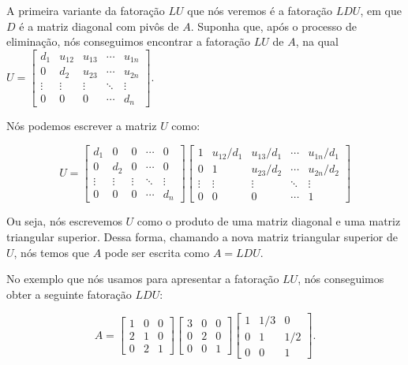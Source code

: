A primeira variante da fatoração $LU$ que nós veremos é a fatoração $LDU$, em que $D$ é a matriz diagonal com pivôs de $A$. Suponha que, após o processo de eliminação, nós conseguimos encontrar a fatoração $LU$ de $A$, na qual $U = \begin{bmatrix}
	d_1 & u_{12} & u_{13} & \cdots & u_{1n} \\
	0 & d_2 & u_{23} & \cdots & u_{2n} \\
	\vdots & \vdots & \vdots & \ddots & \vdots \\
	0 & 0 & 0 & \cdots & d_n
\end{bmatrix}$.

Nós podemos escrever a matriz $U$ como:

$$
U = \begin{bmatrix}
	d_1 & 0 & 0 & \cdots & 0 \\
	0 & d_2 & 0 & \cdots & 0 \\
	\vdots & \vdots & \vdots & \ddots & \vdots \\
	0 & 0 & 0 & \cdots & d_n
\end{bmatrix}
\begin{bmatrix}
	1 & u_{12}/d_1 & u_{13}/d_1 & \cdots & u_{1n}/d_1 \\
	0 & 1 & u_{23}/d_2 & \cdots & u_{2n}/d_2 \\
	\vdots & \vdots & \vdots & \ddots & \vdots \\
	0 & 0 & 0 & \cdots & 1
\end{bmatrix}
$$

Ou seja, nós escrevemos $U$ como o produto de uma matriz diagonal e uma matriz triangular superior. Dessa forma, chamando a nova matriz triangular superior de $U$, nós temos que $A$ pode ser escrita como $A = LDU$.

\begin{Example}
	No exemplo que nós usamos para apresentar a fatoração $LU$, nós conseguimos obter a seguinte fatoração $LDU$:
	
	$$
	A = \begin{bmatrix}
		1 & 0 & 0 \\
		2 & 1 & 0 \\
		0 & 2 & 1
	\end{bmatrix}
	\begin{bmatrix}
		3 & 0 & 0 \\
		0 & 2 & 0 \\
		0 & 0 & 1
	\end{bmatrix}
	\begin{bmatrix}
		1 & 1/3 & 0 \\
		0 & 1 & 1/2 \\
		0 & 0 & 1
	\end{bmatrix}.
	$$
\end{Example}

